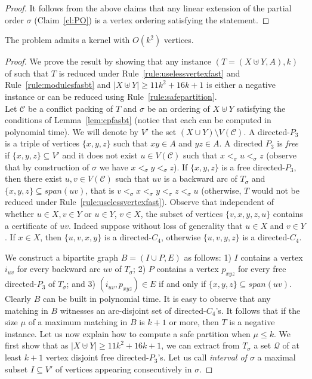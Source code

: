 \begin{proof}
It follows from the above claims that any linear extension of the partial order $\sigma$ (Claim~\ref{cl:PO}) is a vertex ordering satisfying the statement.
\end{proof} 	



\begin{theorem} \label{thm:kernelfasbt}
The \FASBT{} problem admits a kernel with $O(k^2)$ vertices. 
\end{theorem}

\begin{proof}

We prove the result by showing that any instance $(T = (X\uplus Y,A), k)$ of \FASBT{} such that $T$ is reduced under Rule~\ref{rule:uselessvertexfast} and Rule~\ref{rule:modulesfasbt} and $|X\uplus Y| \geqslant 11k^2+16k+1$ is either a negative instance or can be reduced using Rule~\ref{rule:safepartition}. \\ 

Let $\mathcal{C}$ be a conflict packing of $T$ and $\sigma$ be an ordering of $X\uplus Y$ satisfying the conditions of Lemma~\ref{lem:cpfasbt} (notice that each can be computed in polynomial time). 
We will denote by $V'$ the set $(X\cup Y) \setminus V(\mathcal{C})$. A directed-$P_3$ is a triple of vertices $\{x,y,z\}$ such that $xy\in A$ and $yz\in A$. A directed $P_3$ is \emph{free} if $\{x,y,z\}\subseteq V'$ and it does not exist $u\in V(\mathcal{C})$ such that $x<_{\sigma} u<_{\sigma} z$ (observe that by construction of $\sigma$ we have $x<_{\sigma} y<_{\sigma} z$). If $\{x,y,z\}$ is a free directed-$P_3$, then there exist $u,v\in V(\mathcal{C})$ such that $uv$ is a backward arc of $T_{\sigma}$ and $\{x,y,z\}\subseteq span(uv)$, that is $v<_{\sigma} x<_{\sigma} y<_{\sigma} z<_{\sigma} u$ (otherwise, $T$ would not be reduced under Rule~\ref{rule:uselessvertexfast}). Observe that independent of whether $u\in X, v\in Y$ or $u\in Y$, $v\in X$, the subset of vertices $\{v,x,y,z,u\}$ contains a certificate of $uv$. Indeed suppose without loss of generality that $u\in X$ and $v\in Y$.  If $x\in X$, then $\{u,v,x,y\}$ is a directed-$C_4$, otherwise $\{u,v,y,z\}$ is a directed-$C_4$.

We construct a bipartite graph $B=(I\cup P,E)$ as follows: 1) $I$ contains a vertex $i_{uv}$ for every backward arc $uv$ of $T_{\sigma}$; 2) $P$ contains a vertex $p_{xyz}$ for every free directed-$P_3$ of $T_{\sigma}$; and 3) $(i_{uv},p_{xyz})\in E$ if and only if $\{x,y,z\}\subseteq span(uv)$. Clearly $B$ can be built in polynomial time. It is easy to observe that any matching in $B$ witnesses an arc-disjoint set of directed-$C_4$'s. It follows that if the size $\mu$ of a maximum matching in $B$ is $k+1$ or more, then $T$ is a negative instance. Let us now explain how to compute a safe partition when $\mu\leqslant k$. We first show that as $|X\uplus Y| \geqslant 11k^2+16k+1$, we can extract from $T_{\sigma}$ a set $\mathcal{Q}$ of at least $k+1$ vertex disjoint free directed-$P_3$'s. Let us call \emph{interval of $\sigma$} a maximal subset $I\subseteq V'$
of vertices appearing consecutively in $\sigma$. 


\end{proof}
